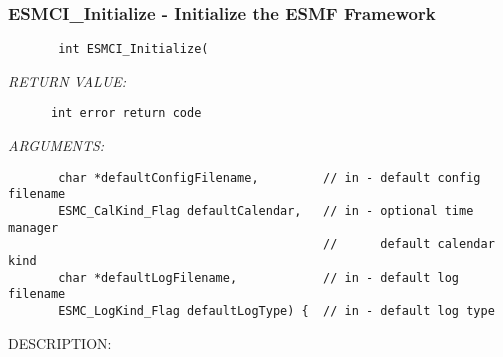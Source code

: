  
\setlength{\oldparskip}{\parskip}
\setlength{\parskip}{1.5ex}
\setlength{\oldparindent}{\parindent}
\setlength{\parindent}{0pt}
\setlength{\oldbaselineskip}{\baselineskip}
\setlength{\baselineskip}{11pt}
 
\def\bv{\begin{verbatim}}
\def\ev{\end{verbatim}}
\def\be{\begin{equation}}
\def\ee{\end{equation}}
\def\bea{\begin{eqnarray}}
\def\eea{\end{eqnarray}}
\def\bi{\begin{itemize}}
\def\ei{\end{itemize}}
\def\bn{\begin{enumerate}}
\def\en{\end{enumerate}}
\def\bd{\begin{description}}
\def\ed{\end{description}}
\def\({\left (}
\def\){\right )}
\def\[{\left [}
\def\]{\right ]}
\def\<{\left  \langle}
\def\>{\right \rangle}
\def\cI{{\cal I}}
\def\diag{\mathop{\rm diag}}
\def\tr{\mathop{\rm tr}}


 
\subsubsection [ESMCI\_Initialize] {ESMCI\_Initialize - Initialize the ESMF Framework}


  
\begin{verbatim}       int ESMCI_Initialize(\end{verbatim}{\em RETURN VALUE:}
\begin{verbatim}      int error return code\end{verbatim}{\em ARGUMENTS:}
\begin{verbatim}       char *defaultConfigFilename,         // in - default config filename
       ESMC_CalKind_Flag defaultCalendar,   // in - optional time manager
                                            //      default calendar kind
       char *defaultLogFilename,            // in - default log filename
       ESMC_LogKind_Flag defaultLogType) {  // in - default log type
    \end{verbatim}
{\sf DESCRIPTION:\\ }


